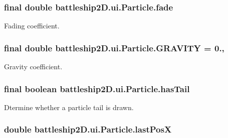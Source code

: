 \hypertarget{classbattleship2D_1_1ui_1_1Particle_aacae09c8362b3db517af7cb42e755c90}{
\subsubsection[{fade}]{\setlength{\rightskip}{0pt plus 5cm}final double battleship2\-D.\-ui.\-Particle.\-fade\hspace{0.3cm}{\ttfamily [private]}}}\label{classbattleship2D_1_1ui_1_1Particle_aacae09c8362b3db517af7cb42e755c90}


Fading coefficient. 

\hypertarget{classbattleship2D_1_1ui_1_1Particle_ab1a0d8047fe05a97b83604fe032a7326}{
\subsubsection[{G\-R\-A\-V\-I\-T\-Y}]{\setlength{\rightskip}{0pt plus 5cm}final double battleship2\-D.\-ui.\-Particle.\-G\-R\-A\-V\-I\-T\-Y = 0.\hspace{0.3cm}{\ttfamily [static]}, {\ttfamily [private]}}}\label{classbattleship2D_1_1ui_1_1Particle_ab1a0d8047fe05a97b83604fe032a7326}


Gravity coefficient. 

\hypertarget{classbattleship2D_1_1ui_1_1Particle_aecbdfda0673ec091a555cbf5c18d346f}{
\subsubsection[{has\-Tail}]{\setlength{\rightskip}{0pt plus 5cm}final boolean battleship2\-D.\-ui.\-Particle.\-has\-Tail\hspace{0.3cm}{\ttfamily [private]}}}\label{classbattleship2D_1_1ui_1_1Particle_aecbdfda0673ec091a555cbf5c18d346f}


Dtermine whether a particle tail is drawn. 

\hypertarget{classbattleship2D_1_1ui_1_1Particle_af78e18d695e448d974013d67b31cc035}{
\subsubsection[{last\-Pos\-X}]{\setlength{\rightskip}{0pt plus 5cm}double battleship2\-D.\-ui.\-Particle.\-last\-Pos\-X\hspace{0.3cm}{\ttfamily [private]}}}\label{classbattleship2D_1_1ui_1_1Particle_af78e18d695e448d974013d67b31cc035}


